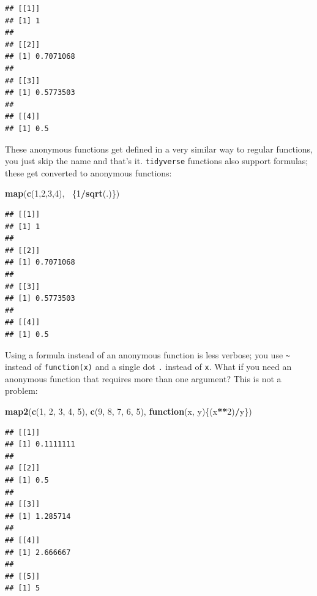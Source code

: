 \documentclass[]{gitbook}
\newenvironment{Shaded}{\begin{snugshade}}{\end{snugshade}}
\newcommand{\ControlFlowTok}[1]{\textcolor[rgb]{0.13,0.29,0.53}{\textbf{#1}}}
\newcommand{\DecValTok}[1]{\textcolor[rgb]{0.00,0.00,0.81}{#1}}
\newcommand{\KeywordTok}[1]{\textcolor[rgb]{0.13,0.29,0.53}{\textbf{#1}}}
\newcommand{\NormalTok}[1]{#1}
\newcommand{\OperatorTok}[1]{\textcolor[rgb]{0.81,0.36,0.00}{\textbf{#1}}}
\begin{document}
\begin{verbatim}
## [[1]]
## [1] 1
## 
## [[2]]
## [1] 0.7071068
## 
## [[3]]
## [1] 0.5773503
## 
## [[4]]
## [1] 0.5
\end{verbatim}

These anonymous functions get defined in a very similar way to regular functions, you just skip the
name and that's it. \texttt{tidyverse} functions also support formulas; these get converted to anonymous functions:

\begin{Shaded}
\begin{Highlighting}[]
\KeywordTok{map}\NormalTok{(}\KeywordTok{c}\NormalTok{(}\DecValTok{1}\NormalTok{,}\DecValTok{2}\NormalTok{,}\DecValTok{3}\NormalTok{,}\DecValTok{4}\NormalTok{), }\OperatorTok{~}\NormalTok{\{}\DecValTok{1}\OperatorTok{/}\KeywordTok{sqrt}\NormalTok{(.)\})}
\end{Highlighting}
\end{Shaded}

\begin{verbatim}
## [[1]]
## [1] 1
## 
## [[2]]
## [1] 0.7071068
## 
## [[3]]
## [1] 0.5773503
## 
## [[4]]
## [1] 0.5
\end{verbatim}

Using a formula instead of an anonymous function is less verbose; you use \texttt{\textasciitilde{}} instead of \texttt{function(x)}
and a single dot \texttt{.} instead of \texttt{x}. What if you need an anonymous function that requires more than
one argument? This is not a problem:

\begin{Shaded}
\begin{Highlighting}[]
\KeywordTok{map2}\NormalTok{(}\KeywordTok{c}\NormalTok{(}\DecValTok{1}\NormalTok{, }\DecValTok{2}\NormalTok{, }\DecValTok{3}\NormalTok{, }\DecValTok{4}\NormalTok{, }\DecValTok{5}\NormalTok{), }\KeywordTok{c}\NormalTok{(}\DecValTok{9}\NormalTok{, }\DecValTok{8}\NormalTok{, }\DecValTok{7}\NormalTok{, }\DecValTok{6}\NormalTok{, }\DecValTok{5}\NormalTok{), }\ControlFlowTok{function}\NormalTok{(x, y)\{(x}\OperatorTok{**}\DecValTok{2}\NormalTok{)}\OperatorTok{/}\NormalTok{y\})}
\end{Highlighting}
\end{Shaded}

\begin{verbatim}
## [[1]]
## [1] 0.1111111
## 
## [[2]]
## [1] 0.5
## 
## [[3]]
## [1] 1.285714
## 
## [[4]]
## [1] 2.666667
## 
## [[5]]
## [1] 5
\end{verbatim}
\end{document}
